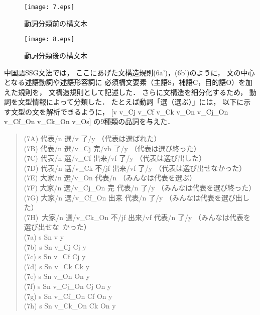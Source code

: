 \documentclass[japanese]{jnlp_1.3a}
\begin{document}
\begin{figure}[b]
\begin{minipage}{0.45\textwidth}
  \begin{center}
       \texttt{[image: 7.eps]}
    \caption{動詞分類前の構文木}
    \label{fig:amb2}
  \end{center}
\end{minipage}
\hfill
\begin{minipage}{0.45\textwidth}
  \begin{center}
       \texttt{[image: 8.eps]}
    \caption{動詞分類後の構文木}
    \label{fig:disamb}
  \end{center}
\end{minipage}
\end{figure}

中国語SSG文法では，
ここにあげた文構造規則(6a')，(6b')のように，
文の中心となる述語動詞や述語形容詞に
必須構文要素（主語S，補語C，目的語O）を加えた規則を，
文構造規則として記述した．
さらに文構造を細分化するため，
動詞を文型情報によって分類した．
たとえば動詞「選（選ぶ）」には，
以下に示す文型の文を解析できるように，
[v v\_Cj v\_Cf v\_Ck v\_On v\_Cj\_On v\_Cf\_On v\_Ck\_On v\_Os]
の9種類の品詞を与えた．
\begin{quotation}\noindent
\文(7A) 代表/n 選/v 了/y （代表は選ばれた）\\
\文(7B) 代表/n 選/v\_Cj 完/vb 了/y （代表は選び終った）\\
\文(7C) 代表/n 選/v\_Cf 出来/vf 了/y （代表は選び出した）\\
\文(7D) 代表/n 選/v\_Ck 不/jf 出来/vf 了/y （代表は選び出せなかった）\\
\文(7E) 大家/n 選/v\_On 代表/n （みんなは代表を選ぶ）\\
\文(7F) 大家/n 選/v\_Cj\_On 完 代表/n 了/y （みんなは代表を選び終った）\\
\文(7G) 大家/n 選/v\_Cf\_On 出来 代表/n 了/y （みんなは代表を選び出した）\\
\文(7H)~大家/n 選/v\_Ck\_On 不/jf 出来/vf 代表/n 了/y （みんなは代表を選び出せな\hspace*{4zw}~かった）\\
(7a) s \ya Sn v y\\
(7b) s \ya Sn v\_Cj Cj y\\
(7c) s \ya Sn v\_Cf Cj y\\
(7d) s \ya Sn v\_Ck Ck y\\
(7e) s \ya Sn v\_On On y\\
(7f) s \ya Sn v\_Cj\_On Cj On y\\
(7g) s \ya Sn v\_Cf\_On Cf On y\\
(7h) s \ya Sn v\_Ck\_On Ck On y
\end{quotation}
\end{document}
